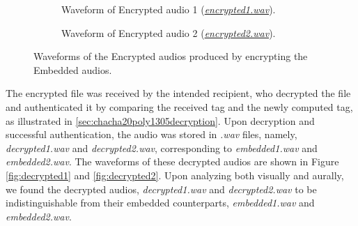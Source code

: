 \documentclass[a4paper]{cas-sc}
\begin{document}
\begin{figure}[pos=h]
    \begin{subfigure}[h]{0.45\textwidth}
        \begin{center}
            
            \caption{Waveform of Encrypted audio 1 (\href{https://drive.google.com/file/d/1fyl3awT4OiCKDLbgOBVyJiQFywCXubHJ/view?usp=drive_link}{\textit{encrypted1.wav}}).}
            \label{fig:encrypted1}
        \end{center}
    \end{subfigure}
    \hfill
    \begin{subfigure}[h]{0.45\textwidth}
        \begin{center}
            
            \caption{Waveform of Encrypted audio 2 (\href{https://drive.google.com/file/d/13Yfz3mYeFxycPza1hi8XbAg1jy4cI5Wr/view?usp=drive_link}{\textit{encrypted2.wav}}).}
            \label{fig:encrypted2}
        \end{center}
    \end{subfigure}
    \caption{Waveforms of the Encrypted audios produced by encrypting the Embedded audios.}
\end{figure}

The encrypted file was received by the intended recipient, who decrypted the file and authenticated it by comparing the received tag and the newly computed tag, as illustrated in \ref{sec:chacha20poly1305decryption}. Upon decryption and successful authentication, the audio was stored in \textit{.wav} files, namely, \textit{decrypted1.wav} and \textit{decrypted2.wav}, corresponding to \textit{embedded1.wav} and \textit{embedded2.wav}. The waveforms of these decrypted audios are shown in Figure \ref{fig:decrypted1} and \ref{fig:decrypted2}. Upon analyzing both visually and aurally, we found the decrypted audios, \textit{decrypted1.wav} and \textit{decrypted2.wav} to be indistinguishable from their embedded counterparts, \textit{embedded1.wav} and \textit{embedded2.wav}.
\end{document}
